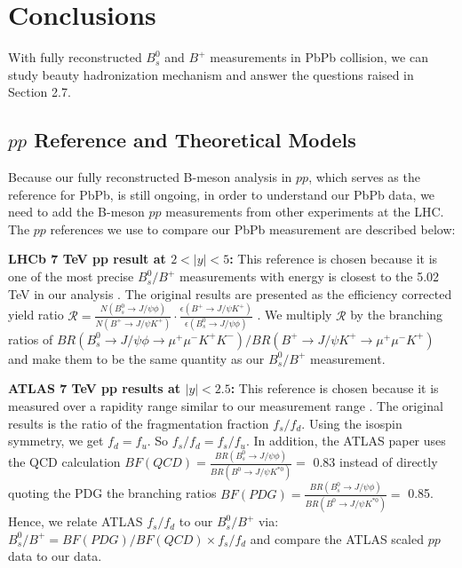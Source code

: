 \chapter{Conclusions}

With fully reconstructed $B^0_s$ and $B^+$ measurements in PbPb collision, we can study beauty hadronization mechanism and answer the questions raised in Section 2.7.

\section{$pp$ Reference and Theoretical Models}

Because our fully reconstructed B-meson analysis in $pp$, which serves as the reference for PbPb, is still ongoing, in order to understand our PbPb data, we need to add the B-meson $pp$ measurements from other experiments at the LHC. The $pp$ references we use to compare our PbPb measurement are described below:

\textbf{LHCb 7 TeV pp result at $2 < |y| < 5$:} This reference is chosen because it is one of the most precise $B^0_s/B^+$ measurements with energy is closest to the 5.02 TeV in our analysis \cite{LHCbFF} . The original results are presented as the efficiency corrected yield ratio $\mathcal{R} = \frac{N(B^0_s \rightarrow J/\psi \phi)}{N(B^+ \rightarrow J/\psi K^+)} \cdot \frac{\epsilon(B^+ \rightarrow J/\psi K^+)}{\epsilon(B^0_s \rightarrow J/\psi \phi)}$ \cite{LHCbFF}. We multiply $\mathcal{R}$ by the branching ratios of $BR(B^0_s \rightarrow J/\psi \phi \rightarrow \mu^+\mu^- K^+ K^-)/BR(B^+ \rightarrow J/\psi K^+ \rightarrow \mu^+\mu^- K^+)$ and make them to be the same quantity as our $B^0_s/B^+$ measurement.

\textbf{ATLAS 7 TeV pp results at $|y| < 2.5$:} This reference is chosen because it is measured over a rapidity range similar to our measurement range \cite{ATLASPPRef} . The original results is the ratio of the fragmentation fraction $f_s/f_d$. Using the isospin symmetry, we get $f_d = f_u$. So $f_s/f_d = f_s/f_u$. In addition, the ATLAS paper uses the QCD calculation $BF(QCD) = \frac{BR(B^0_s \rightarrow J/\psi \phi)}{BR(B^0 \rightarrow J/\psi K^{*0})} =$ 0.83 instead of directly quoting the PDG the branching ratios $BF(PDG) = \frac{BR(B^0_s \rightarrow J/\psi \phi)}{BR(B^0 \rightarrow J/\psi K^{*0})} =$ 0.85. Hence, we relate ATLAS $f_s/f_d$ to our $B^0_s/B^+$ via: $B^0_s/B^+ = BF(PDG)/BF(QCD) \times f_s/f_d$ and compare the ATLAS scaled $pp$ data to our data.


